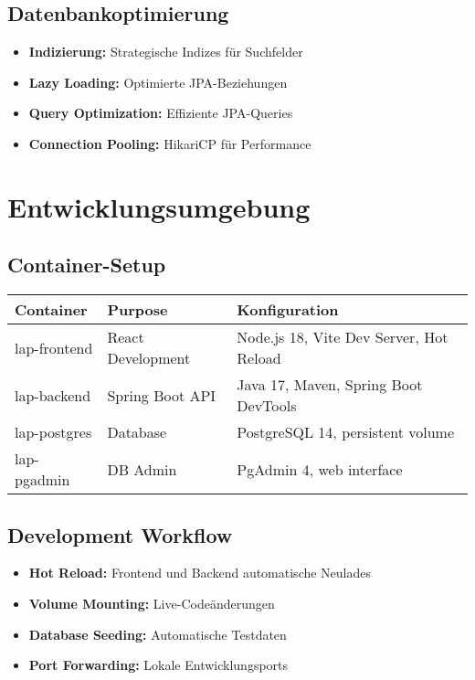 \documentclass[a4paper,12pt]{article}
\begin{document}
\subsection{Datenbankoptimierung}
\begin{itemize}
    \item \textbf{Indizierung:} Strategische Indizes für Suchfelder
    \item \textbf{Lazy Loading:} Optimierte JPA-Beziehungen
    \item \textbf{Query Optimization:} Effiziente JPA-Queries
    \item \textbf{Connection Pooling:} HikariCP für Performance
\end{itemize}

\section{Entwicklungsumgebung}

\subsection{Container-Setup}
\begin{longtable}{|p{}|p{}|p{}|}
\hline
\textbf{Container} & \textbf{Purpose} & \textbf{Konfiguration} \\
\hline
lap-frontend & React Development & Node.js 18, Vite Dev Server, Hot Reload \\
\hline
lap-backend & Spring Boot API & Java 17, Maven, Spring Boot DevTools \\
\hline
lap-postgres & Database & PostgreSQL 14, persistent volume \\
\hline
lap-pgadmin & DB Admin & PgAdmin 4, web interface \\
\hline
\end{longtable}

\subsection{Development Workflow}
\begin{itemize}
    \item \textbf{Hot Reload:} Frontend und Backend automatische Neulades
    \item \textbf{Volume Mounting:} Live-Codeänderungen
    \item \textbf{Database Seeding:} Automatische Testdaten
    \item \textbf{Port Forwarding:} Lokale Entwicklungsports
\end{itemize}
\end{document}
